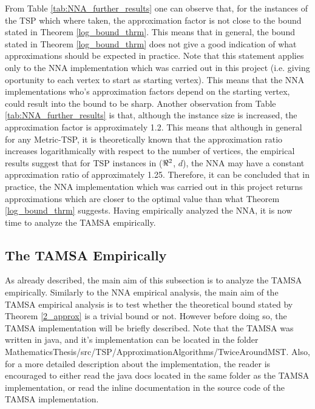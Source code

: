 \documentclass{article}
\begin{document}
From Table \ref{tab:NNA_further_results} one can observe that, for the instances of the TSP which where taken, the approximation factor is not close to the bound stated in Theorem \ref{log_bound_thrm}. This means that in general, the bound stated in Theorem \ref{log_bound_thrm} does not give a good indication of what approximations should be expected in practice. Note that this statement applies only to the NNA implementation which was carried out in this project (i.e. giving oportunity to each vertex to start as starting vertex). This means that the NNA implementations who's approximation factors depend on the starting vertex, could result into the bound to be sharp. Another observation from Table \ref{tab:NNA_further_results} is that, although the instance size is increased, the approximation factor is approximately 1.2. This means that although in general for any Metric-TSP, it is theoretically known that the approximation ratio increases logarithmically with respect to the number of vertices, the empirical results suggest that for TSP instances in ($\real^2$, $d$), the NNA may have a constant approximation ratio of approximately 1.25. Therefore, it can be concluded that in practice, the NNA implementation which was carried out in this project returns approximations which are closer to the optimal value than what Theorem \ref{log_bound_thrm} suggests. Having empirically analyzed the NNA, it is now time to analyze the TAMSA empirically.
\subsection{The TAMSA Empirically}
As already described, the main aim of this subsection is to analyze the TAMSA empirically. Similarly to the NNA empirical analysis, the main aim of the TAMSA empirical analysis is to test whether the theoretical bound stated by Theorem \ref{2_approx} is a trivial bound or not. However before doing so, the TAMSA implementation will be briefly described. Note that the TAMSA was written in java, and it's implementation can be located in the folder MathematicsThesis/src/TSP/ApproximationAlgorithms/TwiceAroundMST. Also, for a more detailed description about the implementation, the reader is encouraged to either read the java docs located in the same folder as the TAMSA implementation, or read the inline documentation in the source code of the TAMSA implementation.
\end{document}
